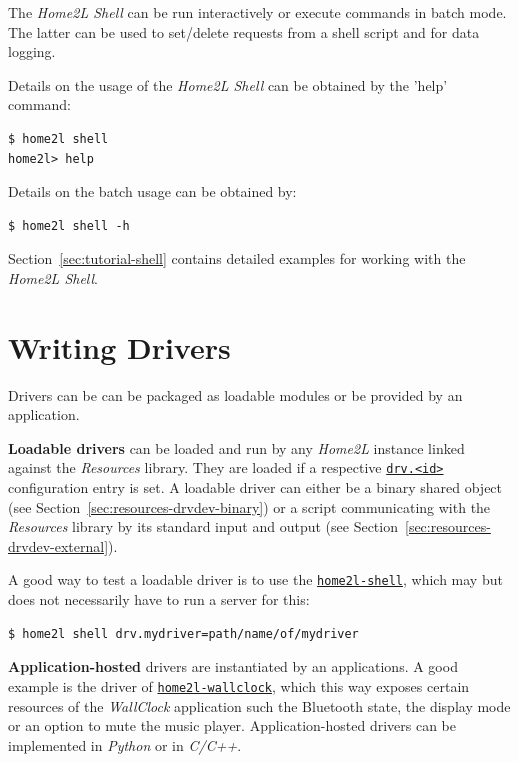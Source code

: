 \documentclass[12pt,english,parskip=half,headheight=19pt]{scrreprt}
\newcommand{\idx}[1]{#1\index{#1}}
\newcommand{\refenv}[1]{\hyperref[env:#1]{\texttt{#1}}}        %
\newcommand{\reftool}[1]{\hyperref[tool:#1]{\texttt{\idx{#1}}}}
\begin{document}
The \textit{Home2L Shell} can be run interactively or execute commands in batch mode.
The latter can be used to set/delete requests from a shell script and for data logging.

Details on the usage of the \textit{Home2L Shell} can be obtained by the 'help' command:
\begin{lstlisting}
$ home2l shell
home2l> help
\end{lstlisting}

Details on the batch usage can be obtained by:
\begin{lstlisting}
$ home2l shell -h
\end{lstlisting}

Section~\ref{sec:tutorial-shell} contains detailed examples for working with the \textit{Home2L Shell}.





\clearpage
\section{Writing Drivers}
\label{sec:resources-drvdev}


Drivers can be can be packaged as loadable modules or be provided by an application.

\textbf{Loadable drivers} can be loaded and run by any \textit{Home2L} instance linked against the \textit{Resources} library. They are loaded if a respective \refenv{drv.<id>} configuration entry is set. A loadable driver can either be a binary shared object (see Section~\ref{sec:resources-drvdev-binary}) or a script communicating with the \textit{Resources} library by its standard input and output (see Section~\ref{sec:resources-drvdev-external}).

A good way to test a loadable driver is to use the \reftool{home2l-shell}, which may but does not necessarily have to run a server for this:
\begin{lstlisting}
$ home2l shell drv.mydriver=path/name/of/mydriver
\end{lstlisting}

\textbf{Application-hosted} drivers are instantiated by an applications. A good example is the driver of \reftool{home2l-wallclock}, which this way exposes certain resources of the \textit{WallClock} application such the Bluetooth state, the display mode or an option to mute the music player.
Application-hosted drivers can be implemented in \textit{Python} or in \textit{C/C++}.
\end{document}
